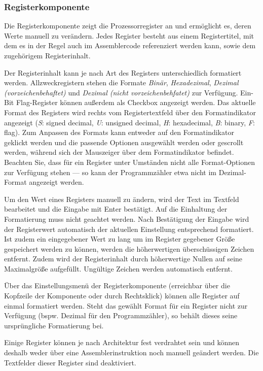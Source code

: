 \subsubsection{Registerkomponente}
Die Registerkomponente zeigt die Prozessorregister an und ermöglicht es, deren Werte manuell zu verändern. Jedes Register besteht aus einem Registertitel, mit dem es in der Regel auch im Assemblercode referenziert werden kann, sowie dem zugehörigem Registerinhalt.

Der Registerinhalt kann je nach Art des Registers unterschiedlich formatiert werden. Allzweckregistern stehen die Formate \textit{Binär}, \textit{Hexadezimal}, \textit{Dezimal (vorzeichenbehaftet)} und \textit{Dezimal (nicht vorzeichenbehfatet)} zur Verfügung. Ein-Bit Flag-Register können außerdem als Checkbox angezeigt werden.
Das aktuelle Format des Registers wird rechts vom Registertextfeld über den Formatindikator angezeigt (\textit{S}: signed decimal, \textit{U}: unsigned decimal, \textit{H}: hexadecimal, \textit{B}: binary, \textit{F}: flag). Zum Anpassen des Formats kann entweder auf den Formatindikator geklickt werden und die passende Optionen ausgewählt werden oder gescrollt werden, während sich der Mauszeiger über dem Formatindikator befindet. Beachten Sie, dass für ein Register unter Umständen nicht alle Format-Optionen zur Verfügung stehen --- so kann der Programmzähler etwa nicht im Dezimal-Format angezeigt werden.

Um den Wert eines Registers manuell zu ändern, wird der Text im Textfeld bearbeitet und die Eingabe mit Enter bestätigt. Auf die Einhaltung der Formatierung muss nicht geachtet werden. Nach Bestätigung der Eingabe wird der Registerwert automatisch der aktuellen Einstellung entsprechend formatiert. Ist zudem ein eingegebener Wert zu lang um im Register gegebener Größe gespeichert werden zu können, werden die höherwertigen überschüssigen Zeichen entfernt. Zudem wird der Registerinhalt durch höherwertige Nullen auf seine Maximalgröße aufgefüllt. Ungültige Zeichen werden automatisch entfernt.

Über das Einstellungsmenü der Registerkomponente (erreichbar über die Kopfzeile der Komponente oder durch Rechtsklick) können alle Register auf einmal formatiert werden. Steht das gewählt Format für ein Register nicht zur Verfügung (bspw. Dezimal für den Programmzähler), so behält dieses seine ursprüngliche Formatierung bei.

Einige Register können je nach Architektur fest verdrahtet sein und können deshalb weder über eine Assemblerinstruktion noch manuell geändert werden. Die Textfelder dieser Register sind deaktiviert.

